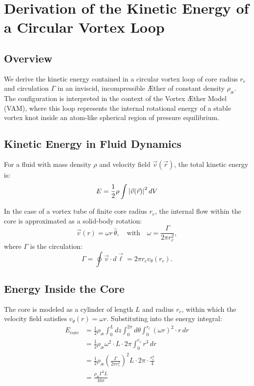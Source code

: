 
\section{Derivation of the Kinetic Energy of a Circular Vortex Loop}\label{sec:derivation-of-the-kinetic-energy-of-a-circular-vortex-loop}

\subsection{Overview}
We derive the kinetic energy contained in a circular vortex loop of core radius $r_c$ and circulation $\Gamma$ in an inviscid, incompressible Æther of constant density $\rho_\text{\ae}$. The configuration is interpreted in the context of the Vortex Æther Model (VAM), where this loop represents the internal rotational energy of a stable vortex knot inside an atom-like spherical region of pressure equilibrium.

\subsection{Kinetic Energy in Fluid Dynamics}
For a fluid with mass density $\rho$ and velocity field $\vec{v}(\vec{r})$, the total kinetic energy is:
\begin{equation}
    E = \frac{1}{2} \rho \int \abs{\vec{v}(\vec{r})}^2 \, dV
\end{equation}

In the case of a vortex tube of finite core radius $r_c$, the internal flow within the core is approximated as a solid-body rotation:
\begin{equation}
    \vec{v}(r) = \omega r \, \hat{\theta}, \quad \text{with} \quad \omega = \frac{\Gamma}{2\pi r_c^2},
\end{equation}
where $\Gamma$ is the circulation:
\begin{equation}
    \Gamma = \oint \vec{v} \cdot d\vec{\ell} = 2\pi r_c v_\theta(r_c).
\end{equation}

\subsection{Energy Inside the Core}
The core is modeled as a cylinder of length $L$ and radius $r_c$, within which the velocity field satisfies $v_\theta(r) = \omega r$. Substituting into the energy integral:
\begin{align}
    E_\text{core} &= \frac{1}{2} \rho_\text{\ae} \int_0^L dz \int_0^{2\pi} d\theta \int_0^{r_c} (\omega r)^2 \cdot r \, dr \\
    &= \frac{1}{2} \rho_\text{\ae} \omega^2 \cdot L \cdot 2\pi \int_0^{r_c} r^3 \, dr \\
    &= \frac{1}{2} \rho_\text{\ae} \left(\frac{\Gamma}{2\pi r_c^2}\right)^2 L \cdot 2\pi \cdot \frac{r_c^4}{4} \\
    &= \frac{\rho_\text{\ae} \Gamma^2 L}{16\pi}
\end{align}

